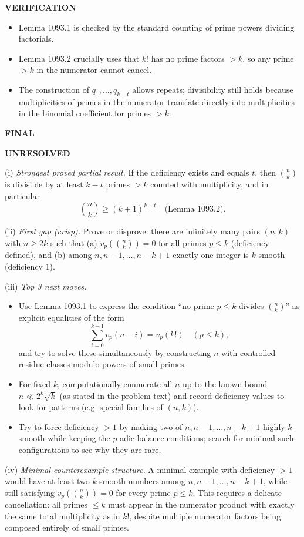 \textbf{VERIFICATION}

\begin{itemize}
\item Lemma 1093.1 is checked by the standard counting of prime powers dividing factorials.
\item Lemma 1093.2 crucially uses that $k!$ has no prime factors $>k$, so any prime $>k$ in the numerator cannot cancel.
\item The construction of $q_1,\dots,q_{k-t}$ allows repeats; divisibility still holds because multiplicities of primes in the numerator translate directly into multiplicities in the binomial coefficient for primes $>k$.
\end{itemize}

\textbf{FINAL}

\textbf{UNRESOLVED}

(i) \emph{Strongest proved partial result.} If the deficiency exists and equals $t$, then $\binom{n}{k}$ is divisible by at least $k-t$ primes $>k$ counted with multiplicity, and in particular
\[\binom{n}{k}\ge (k+1)^{k-t}\quad\text{(Lemma 1093.2).}
\]

(ii) \emph{First gap (crisp).} Prove or disprove: there are infinitely many pairs $(n,k)$ with $n\ge 2k$ such that
(a) $v_p\!\left(\binom{n}{k}\right)=0$ for all primes $p\le k$ (deficiency defined), and
(b) among $n,n-1,\dots,n-k+1$ exactly one integer is $k$-smooth (deficiency $1$).

(iii) \emph{Top 3 next moves.}
\begin{itemize}
\item Use Lemma 1093.1 to express the condition ``no prime $p\le k$ divides $\binom{n}{k}$'' as explicit equalities of the form
\[\sum_{i=0}^{k-1} v_p(n-i)=v_p(k!)\quad (p\le k),
\]
and try to solve these simultaneously by constructing $n$ with controlled residue classes modulo powers of small primes.
\item For fixed $k$, computationally enumerate all $n$ up to the known bound $n\ll 2^k\sqrt{k}$ (as stated in the problem text) and record deficiency values to look for patterns (e.g. special families of $(n,k)$).
\item Try to force deficiency $>1$ by making two of $n,n-1,\dots,n-k+1$ highly $k$-smooth while keeping the $p$-adic balance conditions; search for minimal such configurations to see why they are rare.
\end{itemize}

(iv) \emph{Minimal counterexample structure.} A minimal example with deficiency $>1$ would have at least two $k$-smooth numbers among $n,n-1,\dots,n-k+1$, while still satisfying $v_p\!\left(\binom{n}{k}\right)=0$ for every prime $p\le k$. This requires a delicate cancellation: all primes $\le k$ must appear in the numerator product with exactly the same total multiplicity as in $k!$, despite multiple numerator factors being composed entirely of small primes.
